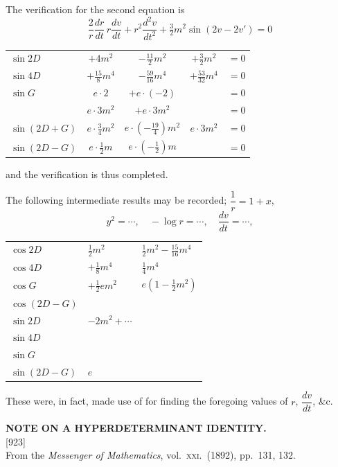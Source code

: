 \documentclass[11pt,a4paper]{article}
\newcommand{\paper}[3]{%
  \clearpage
  \begin{center}
    {\large\bfseries #2}\\[0.5em]
    {\small [#1]}\\[0.3em]
    {\small #3}
  \end{center}
  \vspace{0.5em}
}
\begin{document}
The verification for the second equation is
\[
\frac{2}{r}\frac{dr}{dt}\,r\frac{dv}{dt} + r^2 \frac{d^2 v}{dt^2} + \tfrac{3}{2} m^2 \sin(2v - 2v') = 0
\]
\begin{center}
\small
\begin{tabular}{lcccc}
$\sin 2D$ & $+4 m^2$ & $-\tfrac{11}{2}m^2$ & $+\tfrac{3}{2} m^2$ & $=0$ \\
$\sin 4D$ & $+\tfrac{15}{8}m^4$ & $-\tfrac{59}{16}m^4$ & $+\tfrac{53}{32}m^4$ & $=0$ \\
$\sin G$  & $e\cdot 2$ & $+e\cdot(-2)$ & & $=0$ \\
          & $e\cdot 3 m^2$ & $+e\cdot 3 m^2$ & & $=0$ \\
$\sin(2D + G)$ & $e\cdot\tfrac{3}{4}m^2$ & $e\cdot(-\tfrac{19}{4})m^2$ & $e\cdot 3 m^2$ & $=0$ \\
$\sin(2D - G)$ & $e\cdot\tfrac{1}{2}m$ & $e\cdot(-\tfrac{1}{2})m$ & & $=0$ \\
\end{tabular}
\end{center}
and the verification is thus completed.

The following intermediate results may be recorded; $\dfrac{1}{r} = 1 + x$,
\[
y^2 = \cdots,\quad -\log r = \cdots,\quad \frac{dv}{dt} = \cdots,
\]

\begin{center}
\small
\begin{tabular}{lll}
$\cos 2D$ & $\tfrac{1}{2}m^2$ & $\tfrac{1}{2}m^2 - \tfrac{15}{16}m^4$ \\
$\cos 4D$ & $+\tfrac{1}{8}m^4$ & $\tfrac{1}{4}m^4$ \\
$\cos G$  & $+\tfrac{1}{2}e m^2$ & $e(1 - \tfrac{1}{2} m^2)$ \\
$\cos(2D - G)$ &                 & \\
$\sin 2D$ & $-2 m^2 + \cdots$ & \\
$\sin 4D$ & & \\
$\sin G$  & & \\
$\sin(2D - G)$ & $e$ & \\
\end{tabular}
\end{center}

These were, in fact, made use of for finding the foregoing values of $r$, $\dfrac{dv}{dt}$, \&c.

\paper{923}{NOTE ON A HYPERDETERMINANT IDENTITY.}{From the \textit{Messenger of Mathematics}, vol.\ \textsc{xxi}.\ (1892), pp.\ 131, 132.}
\end{document}
